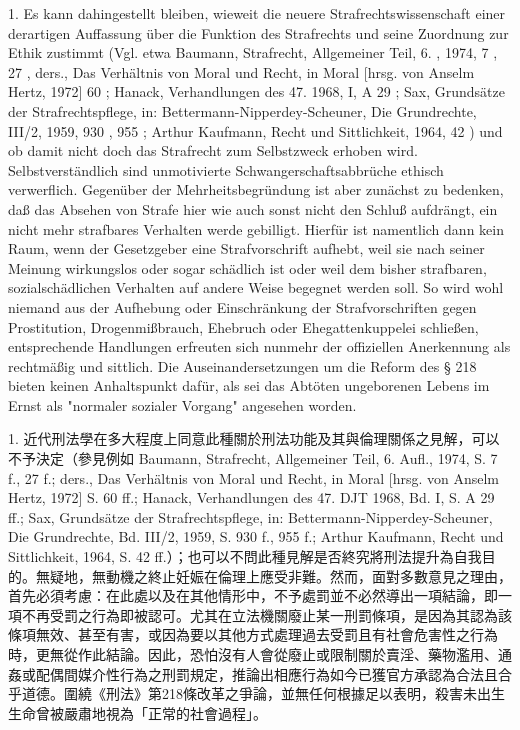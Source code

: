 \documentclass[12pt]{article}
\begin{document}
\syncleft
\begin{sourcepara}
1. Es kann dahingestellt bleiben, wieweit die neuere Strafrechtswissenschaft einer derartigen Auffassung über die Funktion des Strafrechts und seine Zuordnung zur Ethik zustimmt (Vgl. etwa Baumann, Strafrecht, Allgemeiner Teil, 6. \abbrAufl{}, 1974, \abbrS{} 7 \abbrF{}, 27 \abbrF{}, ders., Das Verhältnis von Moral und Recht, in Moral [hrsg. von Anselm Hertz, 1972] \abbrS{} 60 \abbrFF{}; Hanack, Verhandlungen des 47. \abbrDJT{} 1968, \abbrBd{} I, \abbrS{} A 29 \abbrFF{}; Sax, Grundsätze der Strafrechtspflege, in: Bettermann-Nipperdey-Scheuner, Die Grundrechte, \abbrBd{} III/2, 1959, \abbrS{} 930 \abbrF{}, 955 \abbrF{}; Arthur Kaufmann, Recht und Sittlichkeit, 1964, \abbrS{} 42 \abbrFF{}) und ob damit nicht doch das Strafrecht zum Selbstzweck erhoben wird. Selbstverständlich sind unmotivierte Schwangerschaftsabbrüche ethisch verwerflich. Gegenüber der Mehrheitsbegründung ist aber zunächst zu bedenken, daß das Absehen von Strafe hier wie auch sonst nicht den Schluß aufdrängt, ein nicht mehr strafbares Verhalten werde gebilligt. Hierfür ist namentlich dann kein Raum, wenn der Gesetzgeber eine Strafvorschrift aufhebt, weil sie nach seiner Meinung wirkungslos oder sogar schädlich ist oder weil dem bisher strafbaren, sozialschädlichen Verhalten auf andere Weise begegnet werden soll. So wird wohl niemand aus der Aufhebung oder Einschränkung der Strafvorschriften gegen Prostitution, Drogenmißbrauch, Ehebruch oder Ehegattenkuppelei schließen, entsprechende Handlungen erfreuten sich nunmehr der offiziellen Anerkennung als rechtmäßig und sittlich. Die Auseinandersetzungen um die Reform des § 218 \abbrStGB{} bieten keinen Anhaltspunkt dafür, als sei das Abtöten ungeborenen Lebens im Ernst als "normaler sozialer Vorgang" angesehen worden.
\end{sourcepara}
\begin{transpara}
1. 近代刑法學在多大程度上同意此種關於刑法功能及其與倫理關係之見解，可以不予決定（參見例如 Baumann, Strafrecht, Allgemeiner Teil, 6. Aufl., 1974, S. 7 f., 27 f.; ders., Das Verhältnis von Moral und Recht, in Moral [hrsg. von Anselm Hertz, 1972] S. 60 ff.; Hanack, Verhandlungen des 47. DJT 1968, Bd. I, S. A 29 ff.; Sax, Grundsätze der Strafrechtspflege, in: Bettermann-Nipperdey-Scheuner, Die Grundrechte, Bd. III/2, 1959, S. 930 f., 955 f.; Arthur Kaufmann, Recht und Sittlichkeit, 1964, S. 42 ff.）；也可以不問此種見解是否終究將刑法提升為自我目的。無疑地，無動機之終止妊娠在倫理上應受非難。然而，面對多數意見之理由，首先必須考慮：在此處以及在其他情形中，不予處罰並不必然導出一項結論，即一項不再受罰之行為即被認可。尤其在立法機關廢止某一刑罰條項，是因為其認為該條項無效、甚至有害，或因為要以其他方式處理過去受罰且有社會危害性之行為時，更無從作此結論。因此，恐怕沒有人會從廢止或限制關於賣淫、藥物濫用、通姦或配偶間媒介性行為之刑罰規定，推論出相應行為如今已獲官方承認為合法且合乎道德。圍繞《刑法》第218條改革之爭論，並無任何根據足以表明，殺害未出生生命曾被嚴肅地視為「正常的社會過程」。
\end{transpara}
\end{document}
